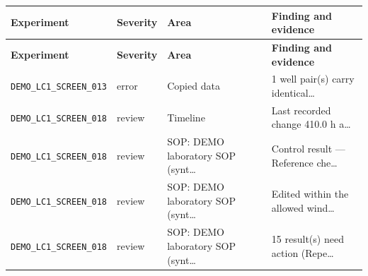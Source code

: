 {\footnotesize
\begin{longtable}{@{}llll@{}}
\toprule \textbf{Experiment} & \textbf{Severity} & \textbf{Area} & \textbf{Finding and evidence} \\\midrule\endfirsthead
\toprule \textbf{Experiment} & \textbf{Severity} & \textbf{Area} & \textbf{Finding and evidence} \\\midrule\endhead
\texttt{DEMO\_LC1\_SCREEN\_013} & error & Copied data & 1 well pair(s) carry identical… \\\hline
\texttt{DEMO\_LC1\_SCREEN\_018} & review & Timeline & Last recorded change 410.0 h a… \\\hline
\texttt{DEMO\_LC1\_SCREEN\_018} & review & SOP: DEMO laboratory SOP (synt… & Control result — Reference che… \\\hline
\texttt{DEMO\_LC1\_SCREEN\_018} & review & SOP: DEMO laboratory SOP (synt… & Edited within the allowed wind… \\\hline
\texttt{DEMO\_LC1\_SCREEN\_018} & review & SOP: DEMO laboratory SOP (synt… & 15 result(s) need action (Repe… \\\hline
\bottomrule
\end{longtable}}

